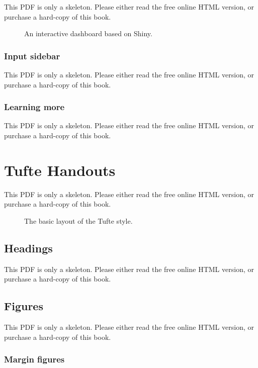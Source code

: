 \documentclass[
  11pt,
]{krantz}
\theoremstyle{definition}
\theoremstyle{definition}
\theoremstyle{definition}
\theoremstyle{definition}
\theoremstyle{remark}
\begin{document}
This PDF is only a skeleton. Please either read the free online HTML version, or purchase a hard-copy of this book.

\begin{figure}\caption{An interactive dashboard based on Shiny.}\end{figure}

\subsection{Input sidebar}\label{input-sidebar}

This PDF is only a skeleton. Please either read the free online HTML version, or purchase a hard-copy of this book.

\subsection{Learning more}\label{learning-more}

This PDF is only a skeleton. Please either read the free online HTML version, or purchase a hard-copy of this book.

\chapter{Tufte Handouts}\label{tufte-handouts}

This PDF is only a skeleton. Please either read the free online HTML version, or purchase a hard-copy of this book.

\begin{figure}\caption{The basic layout of the Tufte style.}\end{figure}

\section{Headings}\label{tufte-headings}

This PDF is only a skeleton. Please either read the free online HTML version, or purchase a hard-copy of this book.

\section{Figures}\label{tufte-figures}

This PDF is only a skeleton. Please either read the free online HTML version, or purchase a hard-copy of this book.

\subsection{Margin figures}\label{margin-figures}
\end{document}

